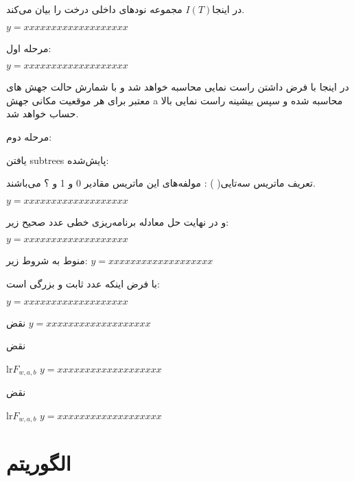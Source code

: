 در اینجا$I(T)$ مجموعه نودهای داخلی درخت  را بیان می‌کند. 

\begin{math}
	y=xxxxxxxxxxxxxxxxxxx
\end{math}

مرحله اول:

\begin{math}
	y=xxxxxxxxxxxxxxxxxxx
\end{math}


در اینجا با فرض داشتن   راست نمایی محاسبه خواهد شد و    با شمارش حالت جهش های معتبر برای هر موقعیت مکانی جهش a محاسبه شده و سپس بیشینه راست نمایی بالا حساب خواهد شد. 

مرحله دوم:  

یافتن \gls{subtrees} پایش‌شده: 

تعریف ماتریس سه‌تایی( ) : مولفه‌های این ماتریس مقادیر 0 و 1 و ؟ می‌باشند.

\begin{math}
	y=xxxxxxxxxxxxxxxxxxx
\end{math}

و در نهایت حل معادله برنامه‌ریزی خطی عدد صحیح زیر: 

\begin{math}
	y=xxxxxxxxxxxxxxxxxxx
\end{math}


منوط به شروط زیر: 
\begin{math}
	y=xxxxxxxxxxxxxxxxxxx
\end{math}


با فرض اینکه  عدد ثابت و بزرگی است: 

\begin{math}
	y=xxxxxxxxxxxxxxxxxxx
\end{math}


نقض 
\begin{math}
	y=xxxxxxxxxxxxxxxxxxx
\end{math}


نقض 

lr{$F_{w,a,b}$}
\begin{math}
	y=xxxxxxxxxxxxxxxxxxx
\end{math}


نقض 

lr{$F_{w,a,b}$}
\begin{math}
	y=xxxxxxxxxxxxxxxxxxx
\end{math}


\section{الگوریتم   \cite{azer2020tumor}}

